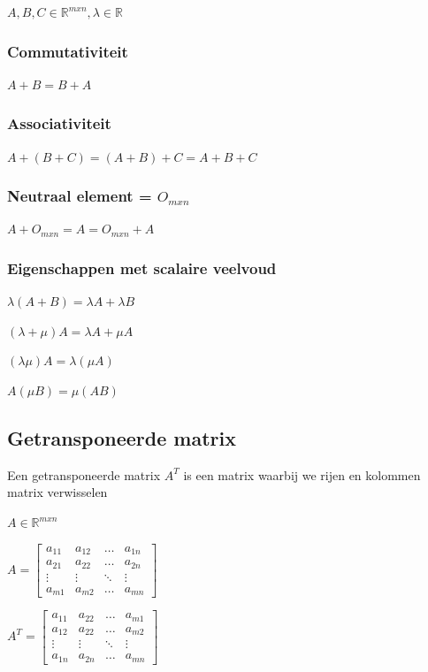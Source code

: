 \documentclass{article}
\begin{document}
$A, B, C \in \mathbb{R}^{mxn}, \lambda \in \mathbb{R}$

\subsubsection{Commutativiteit}

$A + B = B + A$

\subsubsection{Associativiteit}

$A + (B + C) = (A + B) + C = A + B + C$

\subsubsection{Neutraal element = $O_{mxn}$}

$A + O_{mxn} = A = O_{mxn} + A$

\subsubsection{Eigenschappen met scalaire veelvoud}

$\lambda(A + B) = \lambda A + \lambda B$

$(\lambda + \mu)A = \lambda A + \mu A$

$(\lambda \mu)A = \lambda(\mu A)$

$A (\mu B) = \mu (AB)$

\subsection{Getransponeerde matrix}

Een getransponeerde matrix $A^T$ is een matrix waarbij we rijen en kolommen matrix verwisselen

$A \in \mathbb{R}^{mxn}$

$A = \begin{bmatrix}
    a_{11} & a_{12} & \dots & a_{1n}\\
    a_{21} & a_{22} & \dots & a_{2n}\\
    \vdots & \vdots & \ddots & \vdots\\
    a_{m1} & a_{m2} & \dots & a_{mn}
\end{bmatrix}$

$A^T = \begin{bmatrix}
    a_{11} & a_{22} & \dots & a_{m1}\\
    a_{12} & a_{22} & \dots & a_{m2}\\
    \vdots & \vdots & \ddots & \vdots\\
    a_{1n} & a_{2n} & \dots & a_{mn}
\end{bmatrix}$
\end{document}

